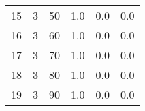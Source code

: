 \documentclass{article}
\begin{document}
\begin{center}
\begin{tabular}{llllll}
15 &         3 &         50 &              1.0 &                       0.0 &                                   0.0 \\
16 &         3 &         60 &              1.0 &                       0.0 &                                   0.0 \\
17 &         3 &         70 &              1.0 &                       0.0 &                                   0.0 \\
18 &         3 &         80 &              1.0 &                       0.0 &                                   0.0 \\
19 &         3 &         90 &              1.0 &                       0.0 &                                   0.0 \\
\bottomrule
\end{tabular}
\end{center}
\newpage
\end{document}
